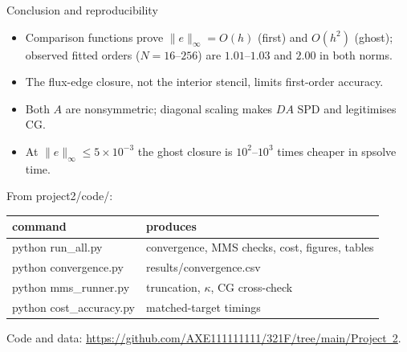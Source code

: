 \documentclass[aspectratio=169,8pt,t]{beamer}
\begin{document}
\begin{frame}{Conclusion and reproducibility}
\bodytop
\begin{itemize}\setlength{\itemsep}{\blockskip}
\item Comparison functions prove $\|e\|_\infty=O(h)$ (first) and $O(h^2)$ (ghost); observed fitted orders ($N=16$--$256$) are $1.01$--$1.03$ and $2.00$ in both norms.
\item The flux-edge closure, not the interior stencil, limits first-order accuracy.
\item Both $A$ are nonsymmetric; diagonal scaling makes $DA$ SPD and legitimises CG.
\item At $\|e\|_\infty\le5\times10^{-3}$ the ghost closure is $10^{2}$--$10^{3}$ times cheaper in \textrm{spsolve} time.
\end{itemize}
\blockgap
{} From \textrm{project2/code/}:
\par\vspace{0.4em}
{\tabfont\begin{tabular}{@{}ll@{}}\toprule
command & produces\\\midrule
\textrm{python run\_all.py} & convergence, MMS checks, cost, figures, tables\\
\textrm{python convergence.py} & \textrm{results/convergence.csv}\\
\textrm{python mms\_runner.py} & truncation, $\kappa$, CG cross-check\\
\textrm{python cost\_accuracy.py} & matched-target timings\\\bottomrule
\end{tabular}}
\closing{Code and data: \href{https://github.com/AXE111111111/321F/tree/main/Project\%202}{\textcolor[RGB]{11,61,145}{\underline{\textrm{https://github.com/AXE111111111/321F/tree/main/Project~2}}}}.}
\end{frame}
\end{document}

